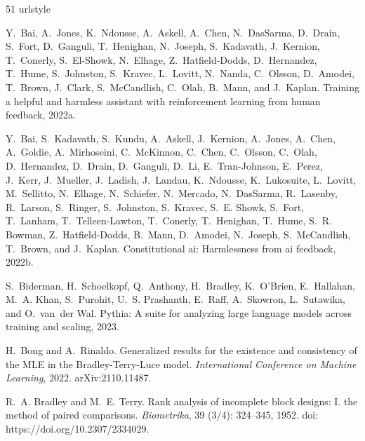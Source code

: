 \label{dpo-bibliography}\begin{thebibliography}{51}
\providecommand{\natexlab}[1]{#1}
\providecommand{\url}[1]{\texttt{#1}}
\expandafter\ifx\csname urlstyle\endcsname\relax
  \providecommand{\doi}[1]{doi: #1}\else
  \providecommand{\doi}{doi: \begingroup \urlstyle{rm}\Url}\fi

Y.~Bai, A.~Jones, K.~Ndousse, A.~Askell, A.~Chen, N.~DasSarma, D.~Drain,
  S.~Fort, D.~Ganguli, T.~Henighan, N.~Joseph, S.~Kadavath, J.~Kernion,
  T.~Conerly, S.~El-Showk, N.~Elhage, Z.~Hatfield-Dodds, D.~Hernandez, T.~Hume,
  S.~Johnston, S.~Kravec, L.~Lovitt, N.~Nanda, C.~Olsson, D.~Amodei, T.~Brown,
  J.~Clark, S.~McCandlish, C.~Olah, B.~Mann, and J.~Kaplan.
\newblock Training a helpful and harmless assistant with reinforcement learning
  from human feedback, 2022{\natexlab{a}}.

Y.~Bai, S.~Kadavath, S.~Kundu, A.~Askell, J.~Kernion, A.~Jones, A.~Chen,
  A.~Goldie, A.~Mirhoseini, C.~McKinnon, C.~Chen, C.~Olsson, C.~Olah,
  D.~Hernandez, D.~Drain, D.~Ganguli, D.~Li, E.~Tran-Johnson, E.~Perez,
  J.~Kerr, J.~Mueller, J.~Ladish, J.~Landau, K.~Ndousse, K.~Lukosuite,
  L.~Lovitt, M.~Sellitto, N.~Elhage, N.~Schiefer, N.~Mercado, N.~DasSarma,
  R.~Lasenby, R.~Larson, S.~Ringer, S.~Johnston, S.~Kravec, S.~E. Showk,
  S.~Fort, T.~Lanham, T.~Telleen-Lawton, T.~Conerly, T.~Henighan, T.~Hume,
  S.~R. Bowman, Z.~Hatfield-Dodds, B.~Mann, D.~Amodei, N.~Joseph,
  S.~McCandlish, T.~Brown, and J.~Kaplan.
\newblock Constitutional ai: Harmlessness from ai feedback, 2022{\natexlab{b}}.

S.~Biderman, H.~Schoelkopf, Q.~Anthony, H.~Bradley, K.~O'Brien, E.~Hallahan,
  M.~A. Khan, S.~Purohit, U.~S. Prashanth, E.~Raff, A.~Skowron, L.~Sutawika,
  and O.~van~der Wal.
\newblock Pythia: A suite for analyzing large language models across training
  and scaling, 2023.

H.~Bong and A.~Rinaldo.
\newblock Generalized results for the existence and consistency of the {MLE} in
  the {B}radley-{T}erry-{L}uce model.
\newblock \emph{International Conference on Machine Learning}, 2022.
\newblock arXiv:2110.11487.

R.~A. Bradley and M.~E. Terry.
\newblock Rank analysis of incomplete block designs: I. the method of paired
  comparisons.
\newblock \emph{Biometrika}, 39 (3/4): 324--345, 1952.
\newblock \doi{https://doi.org/10.2307/2334029}.


\end{thebibliography}
